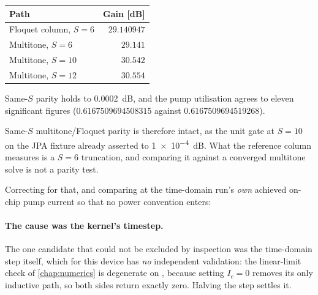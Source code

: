 \begin{measured}[multitone versus Floquet at $I_p = \SI{3.8806468570637416e-6}{\ampere}$]
\begin{center}
\begin{tabular}{@{}l r@{}}
\toprule
Path & Gain [\si{\dB}] \\
\midrule
Floquet column, $S=6$      & $29.140947$ \\
Multitone, $S=6$           & $29.141$ \\
Multitone, $S=10$          & $30.542$ \\
Multitone, $S=12$          & $30.554$ \\
\bottomrule
\end{tabular}
\end{center}
Same-$S$ parity holds to \SI{0.0002}{\dB}, and the pump utilisation agrees to
eleven significant figures ($0.6167509694508315$ against $0.6167509694519268$).
\end{measured}

Same-$S$ multitone/Floquet parity is therefore intact, as the unit gate at
$S=10$ on the JPA fixture already asserted to \SI{1e-4}{\dB}. What the reference
column measures is a $S=6$ truncation, and comparing it against a converged
multitone solve is not a parity test.

Correcting for that, and comparing at the time-domain run's \emph{own} achieved
on-chip pump current so that no power convention enters:

\paragraph{The cause was the kernel's timestep.} The one candidate that could
not be excluded by inspection was the time-domain step itself, which for this
device has \emph{no} independent validation: the linear-limit check of
\cref{chap:numerics} is degenerate on , because setting $I_c=0$
removes its only inductive path, so both sides return exactly zero. Halving the
step settles it.

